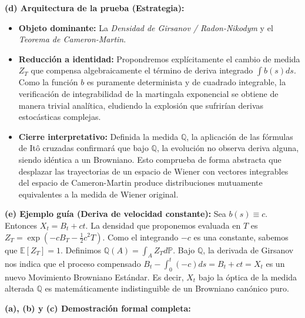 \documentclass[11pt, letterpaper]{article}
\begin{document}
\vspace{5mm}

\begin{solucion}
    \textbf{(d) Arquitectura de la prueba (Estrategia):}
    \begin{itemize}
        \item[(i)] \textbf{Objeto dominante:} La \textit{Densidad de Girsanov / Radon-Nikodym} y el \textit{Teorema de Cameron-Martin}.
        \item[(ii)] \textbf{Reducción a identidad:} Propondremos explícitamente el cambio de medida $Z_T$ que compensa algebraicamente el término de deriva integrado $\int b(s)ds$. Como la función $b$ es puramente determinista y de cuadrado integrable, la verificación de integrabilidad de la martingala exponencial se obtiene de manera trivial analítica, eludiendo la explosión que sufrirían derivas estocásticas complejas.
        \item[(iii)] \textbf{Cierre interpretativo:} Definida la medida $\mathbb{Q}$, la aplicación de las fórmulas de Itô cruzadas confirmará que bajo $\mathbb{Q}$, la evolución no observa deriva alguna, siendo idéntica a un Browniano. Esto comprueba de forma abstracta que desplazar las trayectorias de un espacio de Wiener con vectores integrables del espacio de Cameron-Martin produce distribuciones mutuamente equivalentes a la medida de Wiener original.
    \end{itemize}

    \vspace{3mm}
    \textbf{(e) Ejemplo guía (Deriva de velocidad constante):}
    Sea $b(s) \equiv c$. Entonces $X_t = B_t + ct$.
    La densidad que proponemos evaluada en $T$ es $Z_T = \exp\left( -c B_T - \frac{1}{2} c^2 T \right)$.
    Como el integrando $-c$ es una constante, sabemos que $\mathbb{E}[Z_T] = 1$. Definimos $\mathbb{Q}(A) = \int_A Z_T d\mathbb{P}$.
    Bajo $\mathbb{Q}$, la derivada de Girsanov nos indica que el proceso compensado $B_t - \int_0^t (-c) ds = B_t + ct = X_t$ es un nuevo Movimiento Browniano Estándar. Es decir, $X_t$ bajo la óptica de la medida alterada $\mathbb{Q}$ es matemáticamente indistinguible de un Browniano canónico puro.

    \textbf{(a), (b) y (c) Demostración formal completa:}


\end{solucion}
\end{document}
